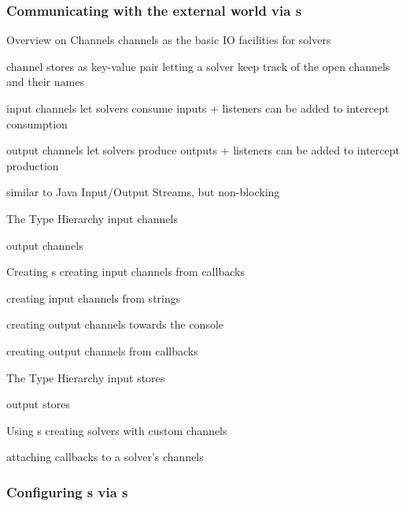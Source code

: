 \documentclass[handout]{beamer}
\begin{document}
\subsubsection{Communicating with the external world via s}

\begin{frame}[allowframebreaks]{Overview on Channels}
    channels as the basic IO facilities for solvers

    channel stores as key-value pair letting a solver keep track of the open channels and their names

    input channels let solvers consume inputs
        + listeners can be added to intercept consumption

    output channels let solvers produce outputs
        + listeners can be added to intercept production

    similar to Java Input/Output Streams, but non-blocking
\end{frame}

\begin{frame}[allowframebreaks]{The  Type Hierarchy}
    input channels

    output channels
\end{frame}

\begin{frame}[allowframebreaks]{Creating s}
    creating input channels from callbacks

    creating input channels from strings

    creating output channels towards the console

    creating output channels from callbacks
\end{frame}

\begin{frame}[allowframebreaks]{The  Type Hierarchy}
    input stores

    output stores
\end{frame}

\begin{frame}[allowframebreaks]{Using s}
    creating solvers with custom channels

    attaching callbacks to a solver's channels
\end{frame}

\subsubsection{Configuring s via s}
\end{document}
